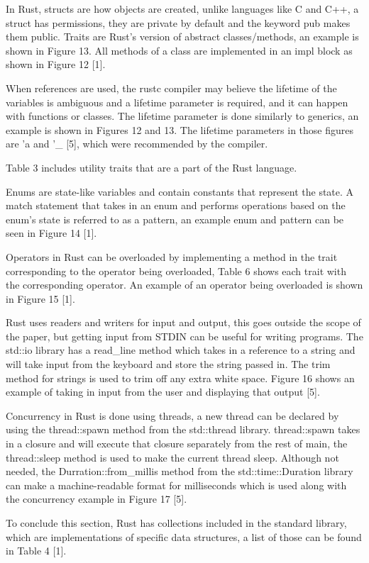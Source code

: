 \documentclass[sigconf,authorversion,nonacm]{acmart}
\begin{document}
In Rust, structs are how objects are created, unlike languages like C and C++, a struct has permissions, they are private by default and the keyword pub makes them public. Traits are Rust's version of abstract classes/methods, an example is shown in Figure 13. All methods of a class are implemented in an impl block as shown in Figure 12 [1]. 

When references are used, the rustc compiler may believe the lifetime of the variables is ambiguous and a lifetime parameter is required, and it can happen with functions or classes. The lifetime parameter is done similarly to generics, an example is shown in Figures 12 and 13. The lifetime parameters in those figures are 'a and '\_ [5], which were recommended by the compiler.

Table 3 includes utility traits that are a part of the Rust language.

Enums are state-like variables and contain constants that represent the state. A match statement that takes in an enum and performs operations based on the enum's state is referred to as a pattern, an example enum and pattern can be seen in Figure 14 [1].

Operators in Rust can be overloaded by implementing a method in the trait corresponding to the operator being overloaded, Table 6 shows each trait with the corresponding operator. An example of an operator being overloaded is shown in Figure 15 [1].

Rust uses readers and writers for input and output, this goes outside the scope of the paper, but getting input from STDIN can be useful for writing programs. The std::io library has a read\_line method which takes in a reference to a string and will take input from the keyboard and store the string passed in. The trim method for strings is used to trim off any extra white space. Figure 16 shows an example of taking in input from the user and displaying that output [5]. 

Concurrency in Rust is done using threads, a new thread can be declared by using the thread::spawn method from the std::thread library. thread::spawn takes in a closure and will execute that closure separately from the rest of main, the thread::sleep method is used to make the current thread sleep. Although not needed, the Durration::from\_millis method from the std::time::Duration library can make a machine-readable format for milliseconds which is used along with the concurrency example in Figure 17 [5]. 

To conclude this section, Rust has collections included in the standard library, which are implementations of specific data structures, a list of those can be found in Table 4 [1].
\end{document}
